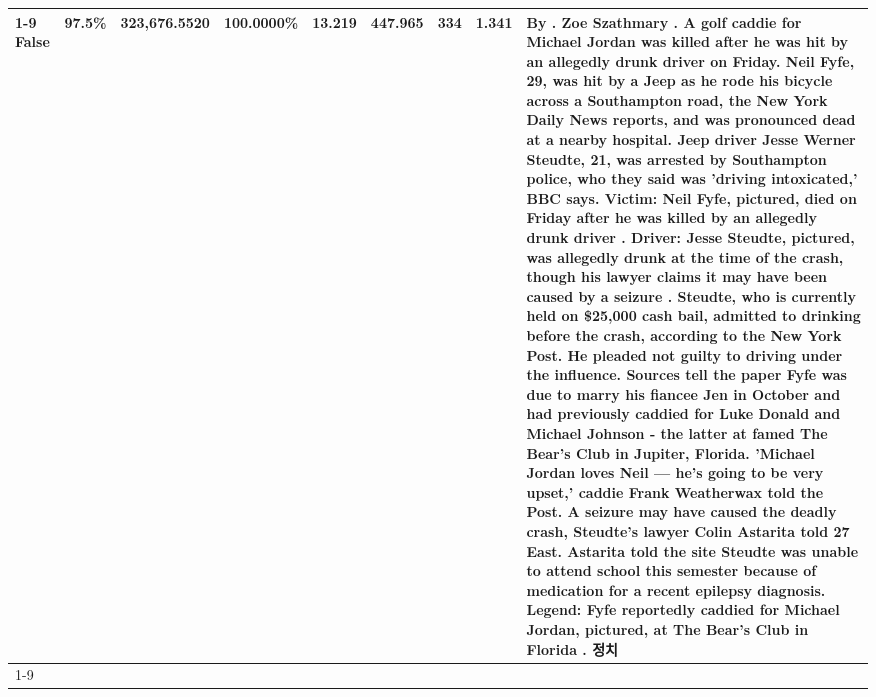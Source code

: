 \begin{table}[H]
\begin{tabular}{lllrlllll}
\cline{1-9}
False & 97.5\% & 323,676.5520 & \bfseries \color{red} 100.0000\% & 13.219 & 447.965 & 334 & 1.341 & By . Zoe Szathmary . A golf caddie for Michael Jordan was killed after he was hit by an allegedly drunk driver on Friday. Neil Fyfe, 29, was hit by a Jeep as he rode his bicycle across a Southampton road, the New York Daily News reports, and was pronounced dead at a nearby hospital. Jeep driver Jesse Werner Steudte, 21, was arrested by Southampton police, who they said was 'driving intoxicated,' BBC says. Victim: Neil Fyfe, pictured, died on Friday after he was killed by an allegedly drunk driver . Driver: Jesse Steudte, pictured, was allegedly drunk at the time of the crash, though his lawyer claims it may have been caused by a seizure . Steudte, who is currently held on \$25,000 cash bail, admitted to drinking before the crash, according to the New York Post. He pleaded not guilty to driving under the influence. Sources tell the paper Fyfe was due to marry his fiancee Jen in October and had previously caddied for Luke Donald and Michael Johnson - the latter at famed The Bear's Club in Jupiter, Florida. 'Michael Jordan loves Neil — he’s going to be very upset,' caddie Frank Weatherwax told the Post. A seizure may have caused the deadly crash, Steudte's lawyer Colin Astarita told 27 East. Astarita told the site Steudte was unable to attend school this semester because of medication for a recent epilepsy diagnosis. Legend: Fyfe reportedly caddied for Michael Jordan, pictured, at The Bear's Club in Florida . 정치 \\
\cline{1-9}
\bottomrule
\end{tabular}
\end{table}
